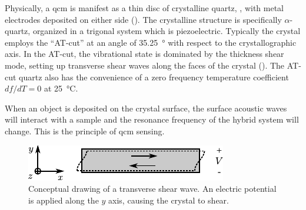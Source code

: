 Physically, a \gls{qcm} is manifest as a thin disc of crystalline quartz,
, with metal electrodes deposited on either side
().  The crystalline structure is specifically
$\alpha$-quartz, organized in a trigonal system which is piezoelectric.
Typically the crystal employs the ``AT-cut'' at an angle of
\SI{35.25}{\degree} with respect to the crystallographic axis.  In the
AT-cut, the vibrational state is dominated by the thickness shear mode,
setting up transverse shear waves along the faces of the crystal
().  The AT-cut quartz also has the convenience of
a zero frequency temperature coefficient $df/dT=0$ at \SI{25}{\celsius}.

When an object is deposited on the crystal surface, the surface acoustic
waves will interact with a sample and the resonance frequency of the hybrid
system will change.  This is the principle of \gls{qcm} sensing.
\begin{figure}[t]
 \centering
 	\includegraphics[keepaspectratio]{qcm/figures/qcm_shearmode.pdf}
	\caption{Conceptual drawing of a transverse shear wave.  An electric
	potential is applied along the $y$ axis, causing the crystal to
	shear.}
\label{fig:qcmshearwave}
\end{figure}
